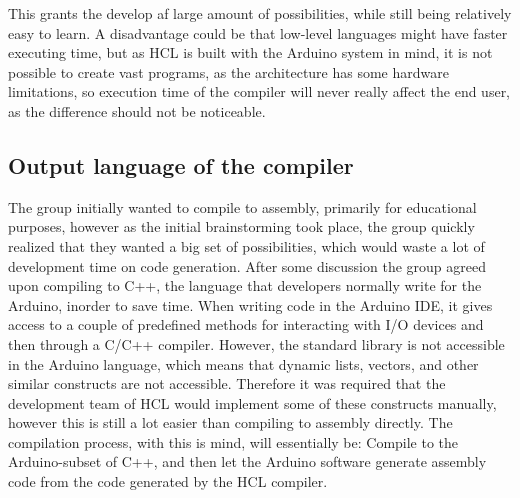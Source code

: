 This grants the develop af large amount of possibilities, while still being relatively easy to learn.
A disadvantage could be that low-level languages might have faster executing time, but as HCL is built with the Arduino system in mind, it is not possible to create vast programs, as the architecture has some hardware limitations, so execution time of the compiler will never really affect the end user, as the difference should not be noticeable.

\subsection{Output language of the compiler}
The group initially wanted to compile to assembly, primarily for educational purposes, however as the initial brainstorming took place, the group quickly realized that they wanted a big set of possibilities, which would waste a lot of development time on code generation. 
After some discussion the group agreed upon compiling to C++, the language that developers normally write for the Arduino, inorder to save time.
When writing code in the Arduino IDE, it gives access to a couple of predefined methods for interacting with I/O devices and then through a C/C++ compiler\cite{ArFAQ}.
However, the standard library is not accessible in the Arduino language, which means that dynamic lists, vectors, and other similar constructs are not accessible.
Therefore it was required that the development team of HCL would implement some of these constructs manually, however this is still a lot easier than compiling to assembly directly. 
The compilation process, with this is mind, will essentially be: Compile to the Arduino-subset of C++, and then let the Arduino software generate assembly code from the code generated by the HCL compiler.
